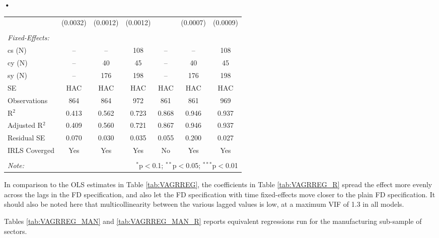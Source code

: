 \textbf{\textbf{•}}\documentclass[a4paper]{article}
\begin{document}
\begin{table}[!htbp]
{\begin{tabular}[t]{lcccccc}
  & (0.0032) & (0.0012) & (0.0012) &  & (0.0007) & (0.0009) \\ 
  & & & & & & \\ 
\midrule \emph{Fixed-Effects:} &   &   &   &   &   &  \\
cs (N) & -- & -- & 108 & -- & -- & 108\\
cy (N) & -- & 40 & 45 & -- & 40 & 45\\
sy (N) & -- & 176 & 198 & -- & 176 & 198\\ \midrule
SE & HAC & HAC & HAC &HAC &HAC &HAC \\
Observations & 864 & 864 & 972 & 861 & 861 & 969 \\ 
R$^{2}$ & 0.413 & 0.562 & 0.723 & 0.868 & 0.946 & 0.937 \\ 
Adjusted R$^{2}$ & 0.409 & 0.560 & 0.721 & 0.867 & 0.946 & 0.937 \\ 
Residual SE & 0.070 & 0.030 & 0.035 & 0.055 & 0.200 & 0.027 \\ 
IRLS Coverged & Yes & Yes & Yes & No & Yes & Yes \\
\bottomrule \\ [-1em]
\textit{Note:}  & \multicolumn{6}{r}{$^{*}$p$<$0.1; $^{**}$p$<$0.05; $^{***}$p$<$0.01} \\ 
\end{tabular} 
}
\end{table} 
\FloatBarrier

In comparison to the OLS estimates in Table \ref{tab:VAGRREG}, the coefficients in Table \ref{tab:VAGRREG_R} spread the effect more evenly across the lags in the FD specification, and also let the FD specification with time fixed-effects move closer to the plain FD specification. It should also be noted here that multicollinearity between the various lagged values is low, at a maximum VIF of 1.3 in all models. \newline

Tables \ref{tab:VAGRREG_MAN} and \ref{tab:VAGRREG_MAN_R} reports equivalent regressions run for the manufacturing sub-sample of sectors. 
\end{document}
